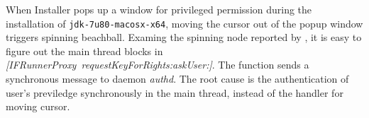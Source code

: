When Installer pops up a window for privileged permission during the
installation of \texttt{jdk-7u80-macosx-x64}, moving the cursor out of the popup
window triggers spinning beachball. Examing the spinning node reported by \xxx, it is easy to figure out the main
thread blocks in \textit{[IFRunnerProxy\ requestKeyForRights:askUser:]}. The
function sends a synchronous message to daemon \textit{authd}. The root cause
is the authentication of user's previledge synchronously in the main thread,
instead of the handler for moving cursor.

